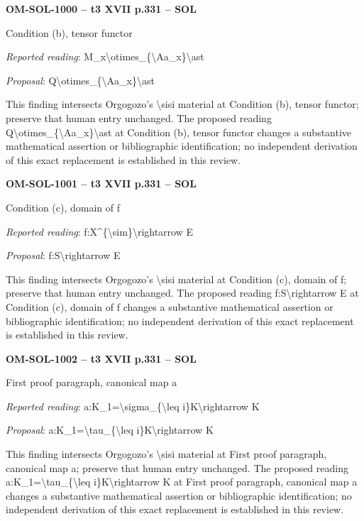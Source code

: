 \par\noindent\textbf{OM-SOL-1000 -- t3 XVII p.331 -- SOL}\par
Condition (b), tensor functor\par
\emph{Reported reading}: M\_x\textbackslash{}otimes\_\{\textbackslash{}Aa\_x\}\textbackslash{}ast\par
\emph{Proposal}: Q\textbackslash{}otimes\_\{\textbackslash{}Aa\_x\}\textbackslash{}ast\par
This finding intersects Orgogozo's \textbackslash{}sisi material at Condition (b), tensor functor; preserve that human entry unchanged. The proposed reading Q\textbackslash{}otimes\_\{\textbackslash{}Aa\_x\}\textbackslash{}ast at Condition (b), tensor functor changes a substantive mathematical assertion or bibliographic identification; no independent derivation of this exact replacement is established in this review.\par
\par\noindent\textbf{OM-SOL-1001 -- t3 XVII p.331 -- SOL}\par
Condition (c), domain of f\par
\emph{Reported reading}: f:X\textasciicircum{}\{\textbackslash{}sim\}\textbackslash{}rightarrow E\par
\emph{Proposal}: f:S\textbackslash{}rightarrow E\par
This finding intersects Orgogozo's \textbackslash{}sisi material at Condition (c), domain of f; preserve that human entry unchanged. The proposed reading f:S\textbackslash{}rightarrow E at Condition (c), domain of f changes a substantive mathematical assertion or bibliographic identification; no independent derivation of this exact replacement is established in this review.\par
\par\noindent\textbf{OM-SOL-1002 -- t3 XVII p.331 -- SOL}\par
First proof paragraph, canonical map a\par
\emph{Reported reading}: a:K\_1=\allowbreak \textbackslash{}sigma\_\{\textbackslash{}leq i\}K\textbackslash{}rightarrow K\par
\emph{Proposal}: a:K\_1=\allowbreak \textbackslash{}tau\_\{\textbackslash{}leq i\}K\textbackslash{}rightarrow K\par
This finding intersects Orgogozo's \textbackslash{}sisi material at First proof paragraph, canonical map a; preserve that human entry unchanged. The proposed reading a:K\_1=\allowbreak \textbackslash{}tau\_\{\textbackslash{}leq i\}K\textbackslash{}rightarrow K at First proof paragraph, canonical map a changes a substantive mathematical assertion or bibliographic identification; no independent derivation of this exact replacement is established in this review.\par
